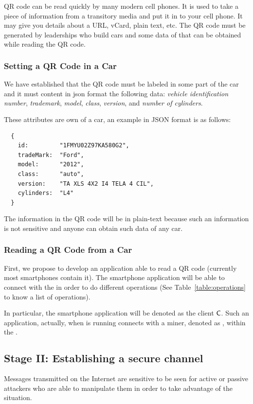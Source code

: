 QR code can be read quickly by many modern cell phones. It is used to take a piece of information from a 
transitory media and put it in to your cell phone. It may give you details about a URL, vCard, plain text, etc.
The QR code must be generated by leaderships who build cars and some data of that
can be obtained while reading the QR code.

\subsubsection{Setting a QR Code in a Car}
\label{sssec:settingQR}
We have established that the QR code must be labeled in some part of the car and it must content in json format 
the following data: 
\textit{vehicle identification number}, 
\textit{trademark}, 
\textit{model}, 
\textit{class}, 
\textit{version}, and
\textit{number of cylinders}.

These attributes are own of a car, an example in JSON format is as follows:
\begin{lstlisting}
  {
    id:         "1FMYU02Z97KA580G2", 
    tradeMark:  "Ford", 
    model:      "2012", 
    class:      "auto", 
    version:    "TA XLS 4X2 I4 TELA 4 CIL", 
    cylinders:  "L4"
  }
\end{lstlisting}

The information in the QR code will be in plain-text because such an information is not sensitive and anyone 
can obtain such data of any car.


\subsubsection{Reading a QR Code from a Car}
\label{sssec:readingQR}

First, we propose to develop an application able to read a QR code (currently most smartphones contain it).
The smartphone application will be able to connect with the \blockchaincarnetwork in order to do different 
operations (See Table~\ref{table:operations} to know a list of operations). 

In particular, the smartphone application will be denoted as the client $\textsf{C}$. Such an application, 
actually, when is running connects with a miner, denoted as \Server, within the \blockchaincarnetwork.



\subsection{Stage II: Establishing a secure channel}
\label{sec:secureChannel}
Messages transmitted on the Internet are sensitive to be seen for
active or passive attackers who are able to manipulate them in order
to take advantage of the situation.

